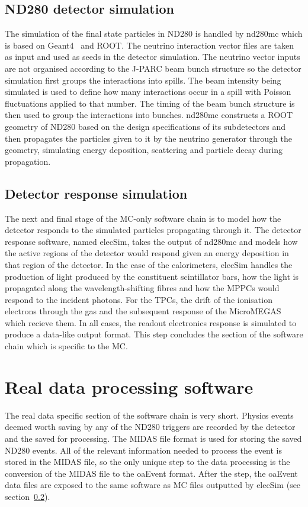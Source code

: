\subsection{ND280 detector simulation}
\label{subsec:ND280DetectorSimulation}
The simulation of the final state particles in ND280 is handled by nd280mc which is based on Geant4~\cite{Agostinelli2003250} and ROOT.  The neutrino interaction vector files are taken as input and used as seeds in the detector simulation.  The neutrino vector inputs are not organised according to the J-PARC beam bunch structure so the detector simulation first groups the interactions into spills.  The beam intensity being simulated is used to define how many interactions occur in a spill with Poisson fluctuations applied to that number.  The timing of the beam bunch structure is then used to group the interactions into bunches. 
\newline
nd280mc constructs a ROOT geometry of ND280 based on the design specifications of its subdetectors and then propagates the particles given to it by the neutrino generator through the geometry, simulating energy deposition, scattering and particle decay during propagation.

\subsection{Detector response simulation}
\label{subsec:DetectorResponseSimulation}
The next and final stage of the MC-only software chain is to model how the detector responds to the simulated particles propagating through it.  The detector response software, named elecSim, takes the output of nd280mc and models how the active regions of the detector would respond given an energy deposition in that region of the detector.  In the case of the calorimeters, elecSim handles the production of light produced by the constituent scintillator bars, how the light is propagated along the wavelength-shifting fibres and how the MPPCs would respond to the incident photons.  For the TPCs, the drift of the ionisation electrons through the gas and the subsequent response of the MicroMEGAS which recieve them.  In all cases, the readout electronics response is simulated to produce a data-like output format.  This step concludes the section of the software chain which is specific to the MC.

\section{Real data processing software}
\label{sec:datachain}
The real data specific section of the software chain is very short.  Physics events deemed worth saving by any of the ND280 triggers are recorded by the detector and the saved for processing.  The MIDAS file format is used for storing the saved ND280 events.  All of the relevant information needed to process the event is stored in the MIDAS file, so the only unique step to the data processing is the conversion of the MIDAS file to the oaEvent format.  After the step, the oaEvent data files are exposed to the same software as MC files outputted by elecSim (see section~\ref{subsec:DetectorResponseSimulation}).


